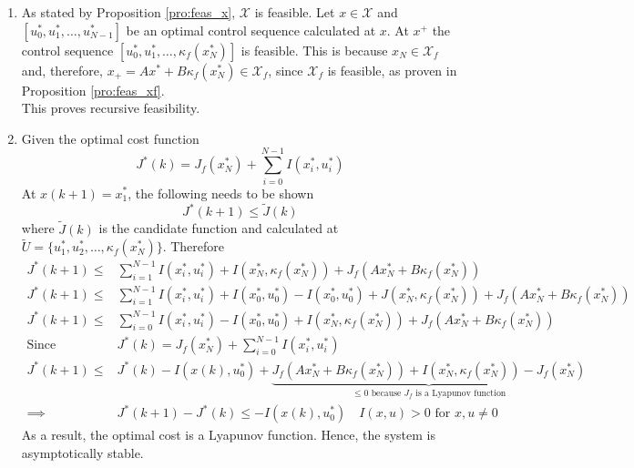 \begin{enumerate}
	\item As stated by Proposition \ref{pro:feas_x}, $\mathcal{X}$ is feasible. Let $x\in \mathcal{X}$ and $[u^*_0, u^*_1, \dots, u^*_{N-1}]$ be an optimal control sequence calculated at $x$. At $x^+$ the control sequence $[u^*_0, u^*_1, \dots, \kappa_f(x^*_N)]$ is feasible. This is because $x_N\in \mathcal{X}_f$ and, therefore, $x_+=Ax^*+B\kappa_f(x^*_N) \in \mathcal{X}_f$, since $\mathcal{X}_f$ is feasible, as proven in Proposition \ref{pro:feas_xf}.\\
	This proves recursive feasibility.
	\item Given the optimal cost function
	\begin{equation*}
	J^*(k) = J_f(x^*_N)+\sum_{i=0}^{N-1}I(x^*_i, u^*_i)
	\end{equation*}
	At $x(k+1) = x^*_1$, the following needs to be shown
	\begin{equation*}
		J^*(k+1) \leq \widetilde{J}(k)
	\end{equation*}
	where $\widetilde{J}(k)$ is the candidate function and calculated at $\widetilde{U} = \{u^*_1, u^*_2, \dots, \kappa_f(x^*_N)\}$. Therefore
	\begin{align*}
		J^*(k+1) \leq& \sum_{i=1}^{N-1}I(x^*_i, u^*_i) + I(x^*_N, \kappa_f(x^*_N)) + J_f(Ax^*_N + B \kappa_f(x^*_N))\\
		J^*(k+1) \leq& \sum_{i=1}^{N-1}I(x^*_i, u^*_i) +I(x^*_0, u^*_0)-I(x^*_0, u^*_0) + J(x^*_N, \kappa_f(x^*_N)) + J_f(Ax^*_N + B \kappa_f(x^*_N))\\
		J^*(k+1) \leq& \sum_{i=0}^{N-1}I(x^*_i, u^*_i) -I(x^*_0, u^*_0) + I(x^*_N, \kappa_f(x^*_N)) + J_f(Ax^*_N + B \kappa_f(x^*_N))\\
		\text{Since }&J^*(k) = J_f(x^*_N)+\sum_{i=0}^{N-1}I(x^*_i, u^*_i)\\
		J^*(k+1) \leq& J^*(k)  -I(x(k), u^*_0)+  \underset{\leq 0 \text{ because $J_f$ is a Lyapunov function}}{\underbrace{J_f(Ax^*_N + B \kappa_f(x^*_N)) + I(x^*_N, \kappa_f(x^*_N)) - J_f(x^*_N)}}\\
		\implies& J^*(k+1) - J^*(k) \leq -I(x(k), u^*_0) \quad I(x,u) >0 \text{ for }x,u \neq 0
	\end{align*}
	As a result, the optimal cost is a Lyapunov function. Hence, the system is asymptotically stable. 
\end{enumerate}










